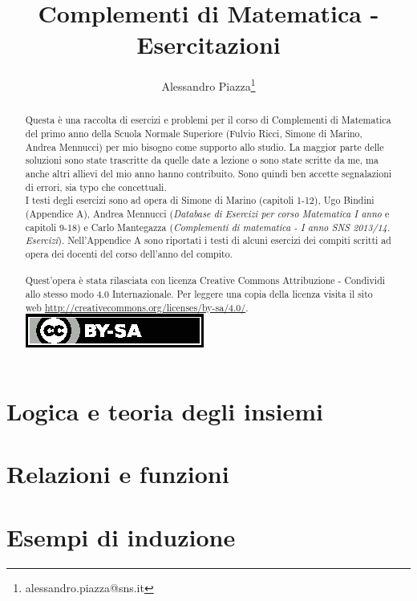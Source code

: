 \documentclass[a4paper]{article}
\title{Complementi di Matematica - Esercitazioni}
\author{Alessandro Piazza\thanks{alessandro.piazza@sns.it}}
\begin{document}
\maketitle

\clearpage

\begin{abstract}
	Questa è una raccolta di esercizi e problemi per il corso di Complementi di Matematica del primo anno della Scuola Normale Superiore (Fulvio Ricci, Simone di Marino, Andrea Mennucci) per mio bisogno come supporto allo studio. La maggior parte delle soluzioni sono state trascritte da quelle date a lezione o sono state scritte da me, ma anche altri allievi del mio anno hanno contribuito. Sono quindi ben accette segnalazioni di errori, sia typo che concettuali. \\
	I testi degli esercizi sono ad opera di Simone di Marino (capitoli 1-12), Ugo Bindini (Appendice A), Andrea Mennucci (\emph{Database di Esercizi per corso Matematica I anno} e capitoli 9-18) e Carlo Mantegazza (\emph{Complementi di matematica - I anno SNS 2013/14. Esercizi}). Nell'Appendice A sono riportati i testi di alcuni esercizi dei compiti scritti ad opera dei docenti del corso dell'anno del compito. \\
	\ \\
	Quest'opera è stata rilasciata con licenza Creative Commons Attribuzione - Condividi allo stesso modo 4.0 Internazionale. Per leggere una copia della licenza visita il sito web \url{http://creativecommons.org/licenses/by-sa/4.0/}. \href{http://creativecommons.org/licenses/by-sa/4.0/}{\includegraphics[scale = 0.5]{by-sa}}
\end{abstract}

\tableofcontents

\clearpage


\section{Logica e teoria degli insiemi}


\section{Relazioni e funzioni}


\section{Esempi di induzione}

\end{document}
